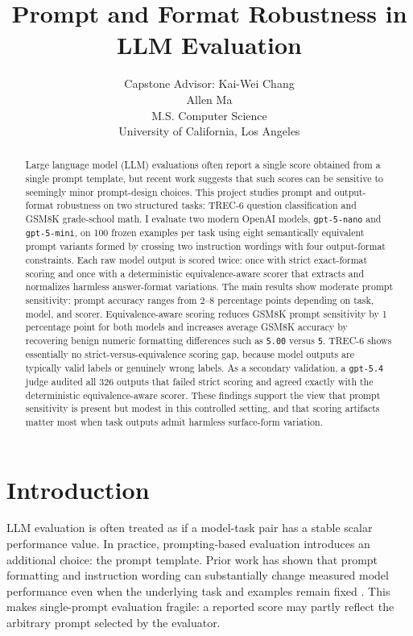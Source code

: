 \documentclass[11pt]{article}
\title{Prompt and Format Robustness in LLM Evaluation}
\author{
Capstone Advisor: Kai-Wei Chang\\[0.75em]
Allen Ma\\
M.S. Computer Science\\
University of California, Los Angeles
}
\date{}
\begin{document}
\maketitle

\begin{abstract}
Large language model (LLM) evaluations often report a single score obtained from a single prompt template, but recent work suggests that such scores can be sensitive to seemingly minor prompt-design choices. This project studies prompt and output-format robustness on two structured tasks: TREC-6 question classification and GSM8K grade-school math. I evaluate two modern OpenAI models, \texttt{gpt-5-nano} and \texttt{gpt-5-mini}, on 100 frozen examples per task using eight semantically equivalent prompt variants formed by crossing two instruction wordings with four output-format constraints. Each raw model output is scored twice: once with strict exact-format scoring and once with a deterministic equivalence-aware scorer that extracts and normalizes harmless answer-format variations. The main results show moderate prompt sensitivity: prompt accuracy ranges from 2--8 percentage points depending on task, model, and scorer. Equivalence-aware scoring reduces GSM8K prompt sensitivity by 1 percentage point for both models and increases average GSM8K accuracy by recovering benign numeric formatting differences such as \texttt{5.00} versus \texttt{5}. TREC-6 shows essentially no strict-versus-equivalence scoring gap, because model outputs are typically valid labels or genuinely wrong labels. As a secondary validation, a \texttt{gpt-5.4} judge audited all 326 outputs that failed strict scoring and agreed exactly with the deterministic equivalence-aware scorer. These findings support the view that prompt sensitivity is present but modest in this controlled setting, and that scoring artifacts matter most when task outputs admit harmless surface-form variation.
\end{abstract}

\section{Introduction}

LLM evaluation is often treated as if a model-task pair has a stable scalar performance value. In practice, prompting-based evaluation introduces an additional choice: the prompt template. Prior work has shown that prompt formatting and instruction wording can substantially change measured model performance even when the underlying task and examples remain fixed \citep{sclar2024sensitivity,mizrahi2024state}. This makes single-prompt evaluation fragile: a reported score may partly reflect the arbitrary prompt selected by the evaluator.
\end{document}
